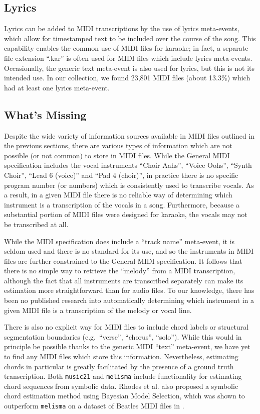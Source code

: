 \documentclass{article}
\begin{document}
\subsection{Lyrics}

Lyrics can be added to MIDI transcriptions by the use of lyrics meta-events, which allow for timestamped text to be included over the course of the song.
This capability enables the common use of MIDI files for karaoke; in fact, a separate file extension ``.kar'' is often used for MIDI files which include lyrics meta-events.
Occasionally, the generic text meta-event is also used for lyrics, but this is not its intended use.
In our collection, we found 23,801 MIDI files (about 13.3\%) which had at least one lyrics meta-event.

\subsection{What's Missing}
\label{sec:missing}

Despite the wide variety of information sources available in MIDI files outlined in the previous sections, there are various types of information which are not possible (or not common) to store in MIDI files.
While the General MIDI specification includes the vocal instruments ``Choir Aahs'', ``Voice Oohs'', ``Synth Choir'', ``Lead 6 (voice)'' and ``Pad 4 (choir)'', in practice there is no specific program number (or numbers) which is consistently used to transcribe vocals.
As a result, in a given MIDI file there is no reliable way of determining which instrument is a transcription of the vocals in a song.
Furthermore, because a substantial portion of MIDI files were designed for karaoke, the vocals may not be transcribed at all.

While the MIDI specification does include a ``track name'' meta-event, it is seldom used and there is no standard for its use, and so the instruments in MIDI files are further constrained to the General MIDI specification.
It follows that there is no simple way to retrieve the ``melody'' from a MIDI transcription, although the fact that all instruments are transcribed separately can make its estimation more straightforward than for audio files.
To our knowledge, there has been no published research into automatically determining which instrument in a given MIDI file is a transcription of the melody or vocal line.

There is also no explicit way for MIDI files to include chord labels or structural segmentation boundaries (e.g.\ ``verse'', ``chorus'', ``solo'').
While this would in principle be possible thanks to the generic MIDI ``text'' meta-event, we have yet to find any MIDI files which store this information.
Nevertheless, estimating chords in particular is greatly facilitated by the presence of a ground truth transcription.
Both \texttt{music21} \cite{cuthbert2010music21} and \texttt{melisma} \cite{sleator2001melisma} include functionality for estimating chord sequences from symbolic data.
Rhodes et al.\cite{rhodes2007bayesian} also proposed a symbolic chord estimation method using Bayesian Model Selection, which was shown to outperform \texttt{melisma} on a dataset of Beatles MIDI files in \cite{ewert2012towards}.
\end{document}
